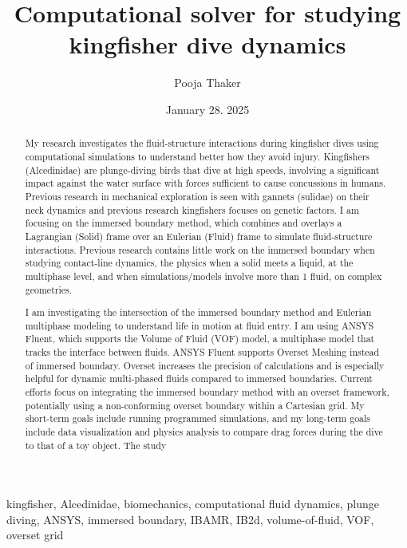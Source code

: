 \documentclass[12pt,conference,onecolumn]{IEEEtran}
\title{Computational solver for studying kingfisher dive dynamics }
\author{Pooja Thaker}
\date{January 28. 2025}
\begin{document}
\maketitle 

\begin{abstract}
My research investigates the fluid-structure interactions during kingfisher dives using computational simulations to understand better how they avoid injury. Kingfishers (Alcedinidae) are plunge-diving birds that dive at high speeds, involving a significant impact against the water surface with forces sufficient to cause concussions in humans. Previous research in mechanical exploration is seen with gannets (sulidae) on their neck dynamics and previous research kingfishers focuses on genetic factors. I am focusing on the immersed boundary method, which combines and overlays a Lagrangian (Solid) frame over an Eulerian (Fluid) frame to simulate fluid-structure interactions. Previous research contains little work on the immersed boundary when studying contact-line dynamics, the physics when a solid meets a liquid, at the multiphase level, and when simulations/models involve more than 1 fluid, on complex geometries. 

I am investigating the intersection of the immersed boundary method and Eulerian multiphase modeling to understand life in motion at fluid entry. I am using ANSYS Fluent, which supports the Volume of Fluid (VOF) model, a multiphase model that tracks the interface between fluids. ANSYS Fluent supports Overset Meshing instead of immersed boundary. Overset increases the precision of calculations and is especially helpful for dynamic multi-phased fluids compared to immersed boundaries. Current efforts focus on integrating the immersed boundary method with an overset framework, potentially using a non-conforming overset boundary within a Cartesian grid. My short-term goals include running programmed simulations, and my long-term goals include data visualization and physics analysis to compare drag forces during the dive to that of a toy object. The study
\end{abstract}

\begin{IEEEkeywords}
kingfisher, Alcedinidae, biomechanics, computational fluid dynamics, plunge diving, ANSYS, immersed boundary, IBAMR, IB2d, volume-of-fluid, VOF, overset grid
\end{IEEEkeywords}
\end{document}
